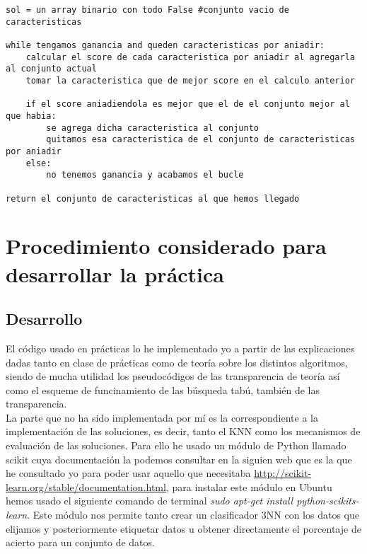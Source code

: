 \documentclass[10pt,a4paper]{article}
\begin{document}
\begin{lstlisting}
sol = un array binario con todo False #conjunto vacio de caracteristicas

while tengamos ganancia and queden caracteristicas por aniadir:
	calcular el score de cada caracteristica por aniadir al agregarla al conjunto actual
	tomar la caracteristica que de mejor score en el calculo anterior
	
	if el score aniadiendola es mejor que el de el conjunto mejor al que habia:
		se agrega dicha caracteristica al conjunto
		quitamos esa caracteristica de el conjunto de caracteristicas por aniadir
	else:
		no tenemos ganancia y acabamos el bucle
		
return el conjunto de caracteristicas al que hemos llegado
\end{lstlisting}
\newpage
\section{\color[rgb]{0.0,0.0,0.21}Procedimiento considerado para desarrollar la práctica}

\subsection{\color[rgb]{0.0,0.0,0.51}Desarrollo}

El código usado en prácticas lo he implementado yo a partir de las explicaciones dadas tanto en clase de prácticas como de teoría sobre los distintos algoritmos, siendo de mucha utilidad los pseudocódigos de las transparencia de teoría así como el esqueme de funcinamiento de las búsqueda tabú, también de las transparencia.\\

La parte que no ha sido implementada por mí es la correspondiente a la implementación de las soluciones, es decir, tanto el KNN como los mecanismos de evaluación de las soluciones. Para ello he usado un módulo de Python llamado scikit cuya documentación la podemos consultar en la siguien web que es la que he consultado yo para poder usar aquello que necesitaba \url{http://scikit-learn.org/stable/documentation.html}, para instalar este módulo en Ubuntu hemos usado el siguiente comando de terminal \textit{sudo apt-get install python-scikits-learn}. Este módulo nos permite tanto crear un clasificador 3NN con los datos que elijamos y posteriormente etiquetar datos u obtener directamente el porcentaje de acierto para un conjunto de datos.\\
\end{document}
